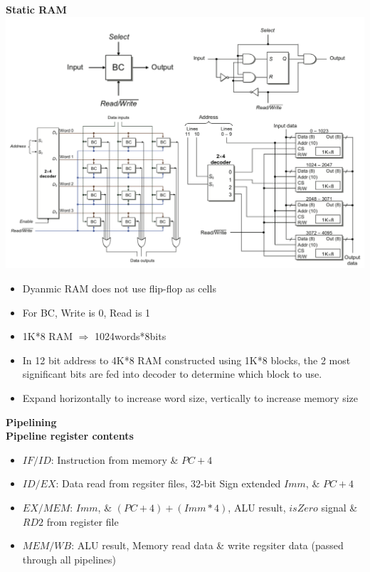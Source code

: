 \documentclass[a4paper]{article} \usepackage[backend=biber, style=numeric, sorting=none]{biblatex}
\begin{document}
\begin{multicols*}{4}
\textbf{{Static RAM}}
\\ {\centering \includegraphics[scale=0.13]{staticRAM}}
\begin{itemize}[leftmargin=*]
\itemsep -0.5em
\item Dyanmic RAM does not use flip-flop as cells
\item For BC, Write is 0, Read is 1 
\item 1K*8 RAM $\Rightarrow$ 1024words*8bits
\item In 12 bit address to 4K*8 RAM constructed using 1K*8 blocks, the 2 most significant bits are fed into decoder to determine which block to use. 
\item Expand horizontally to increase word size, vertically to increase memory size
\end{itemize}


{\small\textbf{Pipelining}}
\\ \textbf{{Pipeline register contents}}
\begin{itemize}[leftmargin=*]
\itemsep -0.5em
\item $IF/ID$: Instruction from memory \& $PC + 4$
\item $ID/EX$: Data read from regsiter files, 32-bit Sign extended $Imm$, \& $PC + 4$
\item $EX/MEM$: $Imm$, \& $(PC + 4) + (Imm * 4)$, ALU result, $isZero$ signal \& $RD2$ from register file
\item $MEM/WB$: ALU result, Memory read data \& write regsiter data (passed through all pipelines)
\end{itemize}


\end{multicols*}
\end{document}
